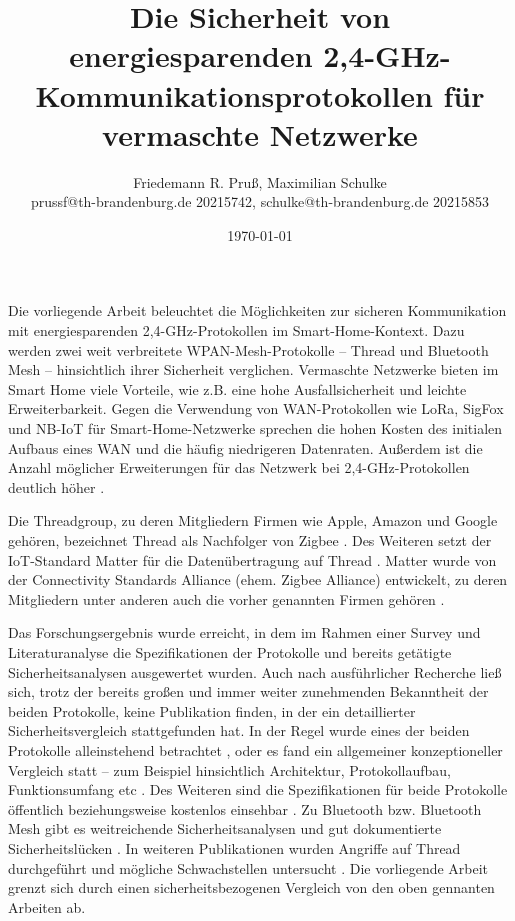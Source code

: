 \documentclass{article}
\title{Die Sicherheit von energiesparenden 2,4-GHz-Kommunikationsprotokollen für vermaschte Netzwerke}
\author{\vspace{-0.1cm}\normalsize{Friedemann R. Pruß, Maximilian Schulke}\\\small{prussf@th-brandenburg.de 20215742, schulke@th-brandenburg.de 20215853}}
\date{\small{\today}\vspace{-0.1cm}}
\begin{document}
\maketitle
\thispagestyle{empty}
\pagestyle{empty}

Die vorliegende Arbeit beleuchtet die Möglichkeiten zur sicheren Kommunikation
mit energiesparenden 2,4-GHz-Protokollen im Smart-Home-Kontext. Dazu werden zwei
weit verbreitete WPAN-Mesh-Protokolle – Thread und Bluetooth Mesh –
hinsichtlich ihrer Sicherheit verglichen. Vermaschte Netzwerke bieten im Smart
Home viele Vorteile, wie z.B. eine hohe Ausfallsicherheit und leichte
Erweiterbarkeit. Gegen die Verwendung von WAN-Protokollen wie LoRa, SigFox und
NB-IoT für Smart-Home-Netzwerke sprechen die hohen Kosten des initialen Aufbaus
eines WAN und die häufig niedrigeren Datenraten. Außerdem ist die Anzahl
möglicher Erweiterungen für das Netzwerk bei 2,4-GHz-Protokollen
deutlich höher \parencite{ThreadMeshVsOtherWirelessIEEE}.

Die Threadgroup, zu deren Mitgliedern Firmen wie Apple, Amazon und Google
gehören, bezeichnet Thread als Nachfolger von Zigbee
\parencite{ThePromiseOfThread}. Des Weiteren
setzt der IoT-Standard Matter für die Datenübertragung auf Thread \parencite{Matter}.
Matter wurde von der Connectivity Standards Alliance (ehem. Zigbee Alliance)
entwickelt, zu deren Mitgliedern unter anderen auch die vorher genannten Firmen
gehören \parencite{Matter}.

Das Forschungsergebnis wurde erreicht, in dem im Rahmen einer Survey und
Literaturanalyse die Spezifikationen der Protokolle und bereits getätigte
Sicherheitsanalysen ausgewertet wurden. Auch nach ausführlicher Recherche ließ
sich, trotz der bereits großen und immer weiter zunehmenden Bekanntheit der
beiden Protokolle, keine Publikation finden, in der ein detaillierter
Sicherheitsvergleich stattgefunden hat. In der Regel wurde eines der beiden
Protokolle alleinstehend betrachtet
\parencite{ThreadApplicationIEEE,BluetoothMeshIntro}, oder es fand ein
allgemeiner konzeptioneller Vergleich statt – zum Beispiel hinsichtlich
Architektur, Protokollaufbau, Funktionsumfang etc
\parencite{ComparativeAnalysisIEEE,ThreadMeshVsOtherWirelessIEEE}. Des Weiteren
sind die Spezifikationen für beide Protokolle öffentlich beziehungsweise
kostenlos einsehbar \parencite{BluetoothSpec,ThreadSpec}. Zu Bluetooth bzw.
Bluetooth Mesh gibt es weitreichende Sicherheitsanalysen und gut dokumentierte
Sicherheitslücken \parencite{BluetoothLowEnergyAttackOxford, BluetoothIssues}.
In weiteren Publikationen wurden Angriffe auf Thread durchgeführt
\parencite{ThreadEMAttack} und mögliche Schwachstellen untersucht
\parencite{ThreadSecurityCSIAC}. Die vorliegende Arbeit grenzt sich durch einen
sicherheitsbezogenen Vergleich von den oben gennanten Arbeiten ab.
\end{document}
